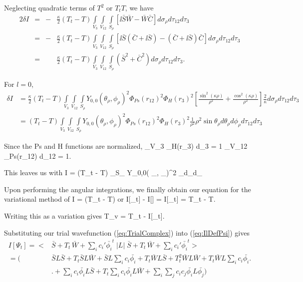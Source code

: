 \documentclass[Dissertation.tex]{subfiles}
\begin{document}
\noindent Neglecting quadratic terms of $T^2$ or $T_t T$, we have
\begin{alignat}{2}
\nonumber \delta I &={}& -&\frac{\kappa}{2} (T_t - T) \int\limits_{V_3} \int\limits_{V_{12}} \int\limits_{S_\rho} \left[\ii \bar{S}\bar{W} - \bar{W}\bar{C}\right] d\sigma_\rho d\tau_{12} d\tau_3 \\
\nonumber &={}& -&\frac{\kappa}{2} (T_t - T) \int\limits_{V_3} \int\limits_{V_{12}} \int\limits_{S_\rho} \left[\ii\bar{S}\left(\bar{C} + \ii\bar{S}\right) - \left(\bar{C} + \ii\bar{S}\right)\bar{C}\right] d\sigma_\rho d\tau_{12} d\tau_3 \\
&={}& &\frac{\kappa}{2} (T_t - T) \int\limits_{V_3} \int\limits_{V_{12}} \int\limits_{S_\rho} \left(\bar{S}^2 + \bar{C}^2\right) d\sigma_\rho d\tau_{12} d\tau_3.
\end{alignat}

For $l = 0$,
\begin{align}
\nonumber \delta I &= \frac{\kappa}{2} (T_t - T) \int\limits_{V_3} \int\limits_{V_{12}} \int\limits_{S_\rho} Y_{0,0}\left( \theta_\rho, \phi_\rho \right)^2 \Phi_{Ps}(r_{12})^2 \Phi_H(r_3)^2 \left[ \frac{\sin^2(\kappa\rho)}{\rho^2} + \frac{\cos^2(\kappa\rho)}{\rho^2}\right] \frac{2}{\kappa} d\sigma_\rho d\tau_{12} d\tau_3 \\
&= (T_t - T) \int\limits_{V_3} \int\limits_{V_{12}} \int\limits_{S_\rho} Y_{0,0}\left( \theta_\rho, \phi_\rho \right)^2 \Phi_{Ps}(r_{12})^2 \Phi_H(r_3)^2 \frac{1}{\rho^2} \rho^2 \sin\theta_\rho d\theta_\rho d\phi_\rho d\tau_{12} d\tau_3
\end{align}

Since the Ps and H functions are normalized,
\beq
\int\limits_{V_3}\! \Phi_H(r_3) d\tau_3 = 1  \int\limits_{V_{12}}\! \Phi_{Ps}(r_{12}) d\tau_{12} = 1.
\label{eq:PsHNormalization}
\eeq

This leaves us with
\beq
\delta I = (T_t - T) \int\limits_{S_\rho} Y_{0,0}\left( \theta_\rho, \phi_\rho \right)^2 \sin\theta_\rho d\theta_\rho d\phi_\rho
\eeq

Upon performing the angular integrations, we finally obtain our equation for the variational method of
\beq
\delta I = (T_t - T)
\eeq
or
\beq
I[\Psi_t] - I[\Psi] = I[\Psi_t] = T_t - T.
\eeq

\noindent Writing this as a variation gives
\beq
T_v = T_t - I[\Psi_t].
\label{eq:ComplexKohnVariation}
\eeq

Substituting our trial wavefunction (\ref{eq:TrialComplex}) into (\ref{eq:IlDefPsi}) gives
\begin{align}
\nonumber I[\Psi_t] = \Big< &\bar{S} + T_t \, \bar{W} + \sum_{i} c_i' \bar{\phi_i}^t \;\Big| L \Big|\; \bar{S} + T_t \, \bar{W} + \sum_{i} c_i' \bar{\phi_i}^t \Big> \\
\nonumber = \Big( &\bar{S} L \bar{S} + T_t \bar{S} L \bar{W} + \bar{S} L \sum_{i} c_i \bar{\phi_i} + T_t \bar{W} L \bar{S} + T_t^2 \bar{W}L\bar{W} + T_t \bar{W} L \sum_{i} c_i \bar{\phi_i} \Big. \\
& \Big. + \sum_{i} c_i \bar{\phi_i} L \bar{S} + T_t \sum_{i} c_i \bar{\phi_i} L \bar{W} + \sum_{i} \sum_{j} c_i c_j \bar{\phi_i} L \bar{\phi_j} \Big) 
\end{align}
\end{document}
